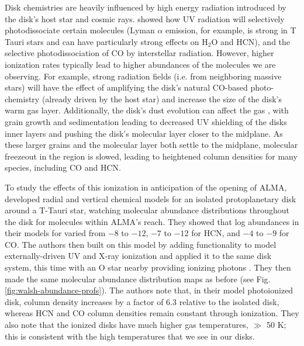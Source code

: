 Disk chemistries are heavily influenced by high energy radiation introduced by the disk's host star and cosmic rays. \citet{Fogel2011} showed how UV radiation will selectively photodissociate certain molecules (Lyman $\alpha$ emission, for example, is strong in T Tauri stars and can have particularly strong effects on H$_2$O and HCN), and the selective photodissociation of CO by interstellar radiation. However, higher ionization rates typically lead to higher abundances of the molecules we are observing. For example, strong radiation fields (i.e. from neighboring massive stars) will have the effect of amplifying the disk's natural CO-based photo-chemistry (already driven by the host star) and increase the size of the disk's warm gas layer. Additionally, the disk's dust evolution can affect the gas \citep{Akimkin2013}, with grain growth and sedimentation leading to decreased UV shielding of the disks inner layers and pushing the disk's molecular layer closer to the midplane. As these larger grains and the molecular layer both settle to the midplane, molecular freezeout in the region is slowed, leading to heightened column densities for many species, including CO and HCN.

To study the effects of this ionization in anticipation of the opening of ALMA, \citet{Walsh2010} developed radial and vertical chemical models for an isolated protoplanetary disk around a T-Tauri star, watching molecular abundance distributions throughout the disk for molecules within ALMA's reach. They showed that log abundances in their models for \hco varied from $-8$ to $-12$, $-7$ to $-12$ for HCN, and $-4$ to $-9$ for CO. The authors then built on this model by adding functionality to model externally-driven UV and X-ray ionization \citep{Walsh2012} and applied it to the same disk system, this time with an O star nearby providing ionizing photons \citep{Walsh2013}. They then made the same molecular abundance distribution maps as before (see Fig.\ref{fig:walsh-abundance-profs}). The authors note that, in their model photoionized disk, \hco column density increases by a factor of 6.3 relative to the isolated disk, whereas HCN and CO column densities remain constant through ionization. They also note that the ionized disks have much higher gas temperatures, $\gg$ 50 K; this is consistent with the high temperatures that we see in our disks.



